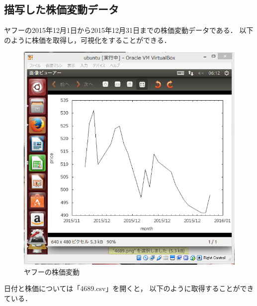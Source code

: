 {\subsection{描写した株価変動データ}

ヤフーの2015年12月1日から2015年12月31日までの株価変動データである．
以下のように株価を取得し，可視化をすることができる．
\begin{figure}[H]
\centering
\includegraphics[width=15cm]{4689kasika.PNG}
\caption{ヤフーの株価変動}\label{サンプル図}
\end{figure}


日付と株価については「4689.csv」を開くと，
以下のように取得することができている．

}
